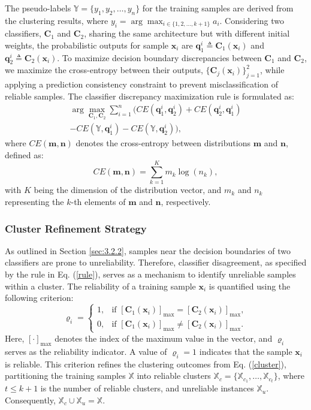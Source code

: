 The pseudo-labels $\mathbb{Y} = \{y_1, y_2, \dots, y_n\}$ for the training samples are derived from the clustering results, where $y_i = \arg\max_{i \in \{1, 2, \dots, k+1\}} a_i$. Considering two classifiers, $\bm{C}_1$ and $\bm{C}_2$, sharing the same architecture but with different initial weights, the probabilistic outputs for sample $\bm{x}_i$ are $\bm{q}_1^i \triangleq \bm{C}_1(\bm{x}_i)$ and $\bm{q}_2^i \triangleq \bm{C}_2(\bm{x}_i)$. To maximize decision boundary discrepancies between $\bm{C}_1$ and $\bm{C}_2$, we maximize the cross-entropy between their outputs, $\{\bm{C}_j(\bm{x}_i)\}_{j=1}^2$, while applying a prediction consistency constraint to prevent misclassification of reliable samples. The classifier discrepancy maximization rule is formulated as:
\begin{multline}\label{rule}
    \arg\max_{\bm{C}_1, \bm{C}_2} \sum_{i = 1}^{n} \Big(CE(\bm{q}_1^i, \bm{q}_2^i) + CE(\bm{q}_2^i, \bm{q}_1^i) \\ - CE(\mathbb{Y}, \bm{q}_1^i) - CE(\mathbb{Y}, \bm{q}_2^i)\Big),
\end{multline}
where $CE(\bm{m}, \bm{n})$ denotes the cross-entropy between distributions $\bm{m}$ and $\bm{n}$, defined as:
\begin{equation}
    CE(\bm{m}, \bm{n}) = \sum_{k = 1}^{K} m_k \log(n_k),
\end{equation}
with $K$ being the dimension of the distribution vector, and $m_k$ and $n_k$ representing the $k$-th elements of $\bm{m}$ and $\bm{n}$, respectively.
\subsubsection{Cluster Refinement Strategy}
As outlined in Section \ref{sec:3.2.2}, samples near the decision boundaries of two classifiers are prone to unreliability. Therefore, classifier disagreement, as specified by the rule in Eq. (\ref{rule}), serves as a mechanism to identify unreliable samples within a cluster. The reliability of a training sample $\bm{x}_i$ is quantified using the following criterion:
\begin{equation}\label{Cluster Reliability Criterion}
    \varrho_{i} = 
    \begin{cases}
        1, & \text{if } [\bm{C}_1(\bm{x}_i)]_{\max} = [\bm{C}_2(\bm{x}_i)]_{\max}, \\        
        0, & \text{if } [\bm{C}_1(\bm{x}_i)]_{\max} \neq [\bm{C}_2(\bm{x}_i)]_{\max}. 
    \end{cases}
\end{equation}
Here, $[\cdot]_{\max}$ denotes the index of the maximum value in the vector, and $\varrho_{i}$ serves as the reliability indicator. A value of $\varrho_{i} = 1$ indicates that the sample $\bm{x}_i$ is reliable. This criterion refines the clustering outcomes from Eq. (\ref{cluster}), partitioning the training samples $\mathbb{X}$ into reliable clusters $\mathbb{X}_c = \{\mathbb{X}_{c_1}, \dots, \mathbb{X}_{c_t}\}$, where $t \leq k+1$ is the number of reliable clusters, and unreliable instances $\mathbb{X}_u$. Consequently, $\mathbb{X}_c \cup \mathbb{X}_u = \mathbb{X}$.
\par
